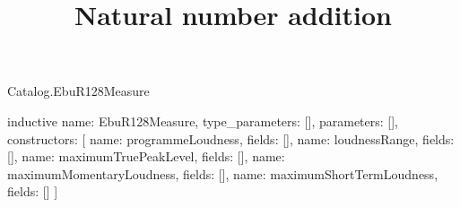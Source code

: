 \begin{lexlean}{Catalog.EbuR128Measure}
\title{Natural number addition}
\begin{semanticmodule}
inductive{
  name: EbuR128Measure,
  type_parameters: [],
  parameters: [],
  constructors: [
    {name: programmeLoudness, fields: []},
    {name: loudnessRange, fields: []},
    {name: maximumTruePeakLevel, fields: []},
    {name: maximumMomentaryLoudness, fields: []},
    {name: maximumShortTermLoudness, fields: []}
  ]
}
\end{semanticmodule}
\end{lexlean}
